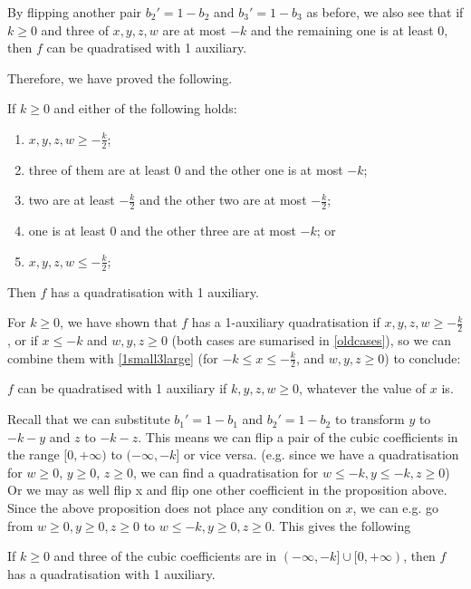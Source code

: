 \documentclass[11pt]{scrartcl}
\begin{document}
By flipping another pair $b_2'=1-b_2$ and $b_3'=1-b_3$ as before, we also see that if $k \ge 0$ and three of $x, y, z, w$ are at most $ -k$ and the remaining one is at least $0$, then $f$ can be quadratised with 1 auxiliary.

Therefore, we have proved the following. 
\begin{proposition}
	\label{oldcases}
	If $k \ge 0$ and either of the following holds:
	\begin{enumerate}
		\item  $x, y, z, w \ge -\frac{k}{2}$;
		\item three of them are at least 0 and the other one is at most $-k$;
		\item two are at least $ -\frac{k}{2}$ and the other two are at most $ -\frac{k}{2}$;
		\item one is at least $0$ and the other three are at most $-k$; or
		\item $x, y, z, w \le -\frac{k}{2}$;
	\end{enumerate}
	Then $f$ has a quadratisation with 1 auxiliary.
\end{proposition}


For $k \ge 0$, we have shown that $f$ has a 1-auxiliary quadratisation if  $x, y, z, w \ge -\frac{k}{2}$, 
or if $x\le -k$ and $w, y, z \ge 0$ (both cases are sumarised in \ref{oldcases}), so we can combine them 
with \ref{1small3large} (for $-k\le x \le -\frac{k}{2}$, and $w, y, z \ge 0$) to conclude:
\begin{proposition}
$f$ can be quadratised with 1 auxiliary if $k, y, z, w \ge 0$, whatever the value of $x$ is.
\end{proposition}

Recall that we can substitute $b_1'=1-b_1$ and $b_2'=1-b_2$ to transform $y$ to $ -k-y $ and $z$ to $-k-z$. This means we can flip a pair of the cubic coefficients in the range $[0, +\infty)$ to $(-\infty, -k]$ or vice versa. (e.g. since we have a quadratisation for $w \ge 0$, $y \ge 0$, $z\ge 0$,
we can find a quadratisation for $w\le -k, y \le -k, z \ge 0$) 
Or we may as well flip x and flip one other coefficient in the proposition above. Since the above proposition does not place any condition on $x$, we can e.g. go from  $w\ge 0, y\ge 0, z\ge 0$ to $w\le -k, y\ge 0, z\ge 0$. This gives the following

\begin{proposition}
	\label{insidebox}
If $k \ge 0$ and three of the cubic coefficients are in $(-\infty, -k] \cup [0, +\infty)$, then $f$ has a quadratisation with 1 auxiliary.
\end{proposition}
\end{document}
